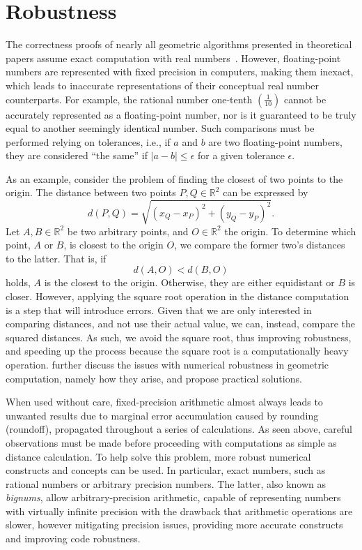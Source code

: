 \section{Robustness}%
\label{sec:related.robustness}

The correctness proofs of nearly all geometric algorithms presented in
theoretical papers assume exact computation with real
numbers~\cite{CGAL:4.13:23LGK}.  However, floating-point numbers are represented
with fixed precision in computers, making them inexact, which leads to
inaccurate representations of their conceptual real number counterparts.  For
example, the rational number one-tenth $\left(\frac{1}{10}\right)$ cannot be
accurately represented as a floating-point number, nor is it guaranteed to be
truly equal to another seemingly identical number.  Such comparisons must be
performed relying on tolerances, i.e., if $a$ and $b$ are two floating-point
numbers, they are considered ``the same'' if $|a - b| \le \epsilon$ for a
given tolerance $\epsilon$.

As an example, consider the problem of finding the closest of two points
to the origin.  The distance between two points $P,Q \in \mathbb{R}^2$ can be
expressed by
%
\begin{equation}\label{eq:distance.2}
  d\left(P, Q\right) =
  \sqrt{\left(x_Q - x_P\right)^2 + \left(y_Q - y_P\right)^2}.
\end{equation}%
%
Let $A,B \in \mathbb{R}^2$ be two arbitrary points, and $O \in \mathbb{R}^2$ the
origin.  To determine which point, $A$ or $B$, is closest to the origin $O$, we
compare the former two's distances to the latter.  That is, if
%
\[ 
  d\left(A, O\right) < d\left(B, O\right) 
\]
%
holds, $A$ is the closest to the origin.  Otherwise, they are either equidistant
or $B$ is closer.  However, applying the square root operation in the distance
computation is a step that will introduce errors.  Given that we are only
interested in comparing distances, and not use their actual value, we can,
instead, compare the squared distances.  As such, we avoid the square root, thus
improving robustness, and speeding up the process because the square root is a
computationally heavy operation.   further discuss the
issues with numerical robustness in geometric computation, namely how they
arise, and propose practical solutions.

When used without care, fixed-precision arithmetic almost always leads to
unwanted results due to marginal error accumulation caused by rounding
(roundoff), propagated throughout a series of calculations.  As seen above,
careful observations must be made before proceeding with computations as simple
as distance calculation.  To help solve this problem, more robust numerical
constructs and concepts can be used.  In particular, exact numbers, such as
rational numbers or arbitrary precision numbers. The latter, also known as
\textit{bignums}, allow arbitrary-precision arithmetic, capable of representing
numbers with virtually infinite precision with the drawback that arithmetic
operations are slower, however mitigating precision issues, providing more
accurate constructs and improving code robustness.

